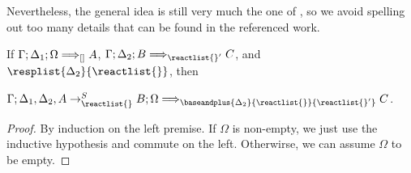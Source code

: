 Nevertheless, the general idea is still very much the one of
\cite{chaudhuri-thesis}, so we avoid spelling out too many details that can be
found in the referenced work.

\begin{lemma}\label{impllemma}
  If $\Gamma; \Delta_1; \Omega \Longrightarrow_{[]} A$,
  $\ztriseq{\Gamma}{\Delta_2}{B}{\reactlist{}'}{C}$, and
  $\resplist{\Delta_2}{\reactlist{}}$, then

  $\ztriseq{\Gamma}{\Delta_1, \Delta_2, A \rightarrow_{\reactlist{}}^S B}{\Omega}{
    \baseandplus{\Delta_2}{\reactlist{}}{\reactlist{}'}
  }{C}$.
\end{lemma}
\begin{proof}
  By induction on the left premise. If $\Omega$ is non-empty, we just use the
  inductive hypothesis and commute on the left. Otherwirse, we can assume
  $\Omega$ to be empty.

\end{proof}
